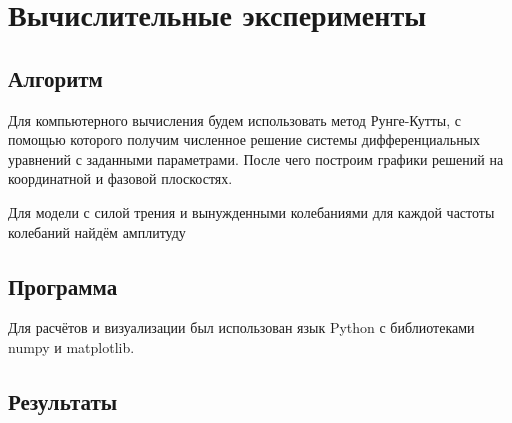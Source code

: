 \section{Вычислительные эксперименты}

    \subsection{Алгоритм}
        Для компьютерного вычисления будем использовать метод Рунге-Кутты, с помощью которого получим численное решение системы дифференциальных уравнений с заданными параметрами. После чего построим графики решений на координатной и фазовой плоскостях.

        Для модели с силой трения и вынужденными колебаниями для каждой частоты колебаний найдём амплитуду


    \subsection{Программа}
        Для расчётов и визуализации был использован язык Python с библиотеками numpy и matplotlib.

        

    \subsection{Результаты}